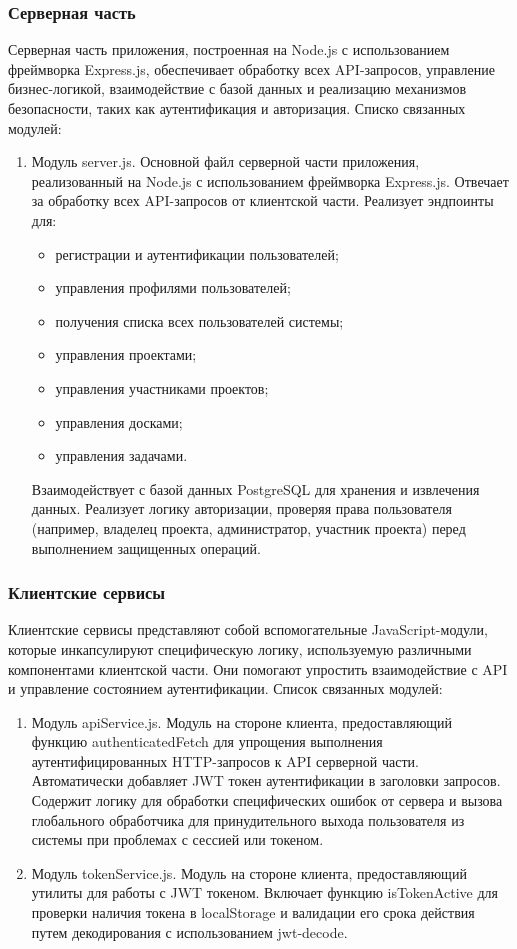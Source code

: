 \subsubsection{Серверная часть}
Серверная часть приложения, построенная на Node.js с использованием фреймворка Express.js, обеспечивает обработку всех API-запросов, управление бизнес-логикой, взаимодействие с базой данных и реализацию механизмов безопасности, таких как аутентификация и авторизация. Списко связанных модулей:
\begin{enumerate}
	\item Модуль server.js. Основной файл серверной части приложения, реализованный на Node.js с использованием фреймворка Express.js. Отвечает за обработку всех API-запросов от клиентской части. Реализует эндпоинты для:
	\begin{itemize}
		\item регистрации и аутентификации пользователей;
		\item управления профилями пользователей;
		\item получения списка всех пользователей системы;
		\item управления проектами;
		\item управления участниками проектов;
		\item управления досками;
		\item управления задачами.
	\end{itemize}

Взаимодействует с базой данных PostgreSQL для хранения и извлечения данных. Реализует логику авторизации, проверяя права пользователя (например, владелец проекта, администратор, участник проекта) перед выполнением защищенных операций.
\end{enumerate}

\subsubsection{Клиентские сервисы}
Клиентские сервисы представляют собой вспомогательные JavaScript-модули, которые инкапсулируют специфическую логику, используемую различными компонентами клиентской части. Они помогают упростить взаимодействие с API и управление состоянием аутентификации. Список связанных модулей:
\begin{enumerate}
	\item Модуль apiService.js. Модуль на стороне клиента, предоставляющий функцию authenticatedFetch для упрощения выполнения аутентифицированных HTTP-запросов к API серверной части. Автоматически добавляет JWT токен аутентификации в заголовки запросов. Содержит логику для обработки специфических ошибок от сервера и вызова глобального обработчика для принудительного выхода пользователя из системы при проблемах с сессией или токеном.
	\item Модуль tokenService.js. Модуль на стороне клиента, предоставляющий утилиты для работы с JWT токеном. Включает функцию isTokenActive для проверки наличия токена в localStorage и валидации его срока действия путем декодирования с использованием jwt-decode.
\end{enumerate}

